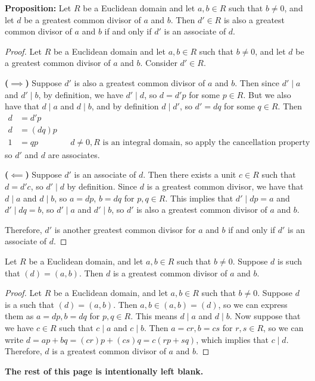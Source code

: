 \documentclass [12pt]{article}
\newcounter{thmcounter}[section]
\renewcommand{\thethmcounter}{\thesection.\arabic{thmcounter}}
\newenvironment{theorem}[1]{
  \refstepcounter{thmcounter}
  \begin{tcolorbox}[title={Theorem \thethmcounter: #1}, colback=green!5!white, colframe=black!75!green]
}{ \end{tcolorbox} }
\renewcommand{\bf}[1]{\textbf{{#1}}}
\begin{document}
\newpage
\bf{Proposition:} Let $R$ be a Euclidean domain and let $a, b \in R$ such that $b \neq 0$, and let
$d$ be a greatest common divisor of $a$ and $b$. Then $d' \in R$ is also a greatest common divisor
of $a$ and $b$ if and only if $d'$ is an associate of $d$.
\begin{proof}
    Let $R$ be a Euclidean domain and let $a, b \in R$ such that $b \neq 0$, and let
    $d$ be a greatest common divisor of $a$ and $b$. Consider $d' \in R$.
    \vspace{0.5em}

    \bf{($\bm{\implies}$)}
    Suppose $d'$ is also a greatest common divisor of $a$ and $b$. Then since $d' \mid a$ and
    $d' \mid b$, by definition, we have $d' \mid d$, so $d = d'p$ for some $p \in R$. But we also
    have that $d \mid a$ and $d \mid b$, and by definition $d \mid d'$, so $d' = dq$ for some
    $q \in R$. Then
    \begin{align*}
        d &= d'p \\
        d &= (dq)p \\
        1 &= qp && d \neq 0, R \text{ is an integral domain, so apply the cancellation property}
    \end{align*}
    so $d'$ and $d$ are associates.
    \vspace{0.5em}

    \bf{($\bm{\impliedby}$)}
    Suppose $d'$ is an associate of $d$. Then there exists a unit $c \in R$ such that $d = d'c$,
    so $d' \mid d$ by definition. Since $d$ is a greatest common divisor, we have that $d \mid a$
    and $d \mid b$, so $a = dp$, $b = dq$ for $p, q \in R$. This implies that $d' \mid dp = a$ and
    $d' \mid dq = b$, so $d' \mid a$ and $d' \mid b$, so $d'$ is also a greatest common divisor of
    $a$ and $b$.
    \vspace{0.5em}

    Therefore, $d'$ is another greatest common divisor for $a$ and $b$ if and only if $d'$ is an
    associate of $d$.
\end{proof}

\begin{theorem}{}
    Let $R$ be a Euclidean domain, and let $a, b \in R$ such that $b \neq 0$. Suppose $d$ is such
    that $(d) = (a, b)$. Then $d$ is a greatest common divisor of $a$ and $b$.
\end{theorem}
\begin{proof}
    Let $R$ be a Euclidean domain, and let $a, b \in R$ such that $b \neq 0$. Suppose $d$ is a such
    that $(d) = (a, b)$. Then $a, b \in (a, b) = (d)$, so we can express them as
    $a = dp, b = dq$ for $p, q \in R$. This means $d \mid a$ and $d \mid b$. Now suppose that
    we have $c \in R$ such that $c \mid a$ and $c \mid b$. Then $a = cr, b = cs$ for $r, s \in R$,
    so we can write $d = ap + bq = (cr)p + (cs)q = c(rp + sq)$, which implies that $c \mid d$.
    Therefore, $d$ is a greatest common divisor of $a$ and $b$.
\end{proof}
\begin{center}
    \vspace{5em}
    \bf{The rest of this page is intentionally left blank.}
\end{center}
\end{document}
